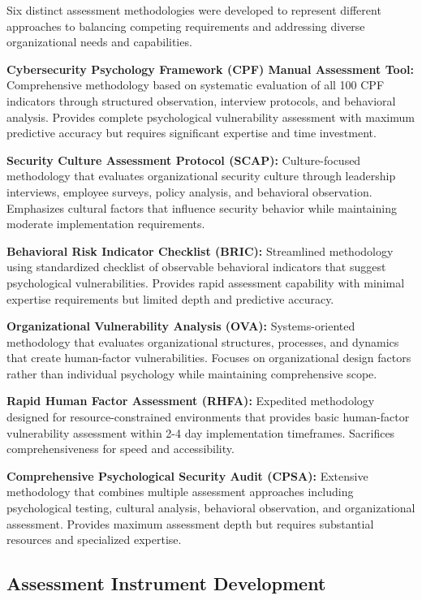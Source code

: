 \documentclass[10pt, twocolumn]{article}
\begin{document}
Six distinct assessment methodologies were developed to represent different approaches to balancing competing requirements and addressing diverse organizational needs and capabilities.

\textbf{Cybersecurity Psychology Framework (CPF) Manual Assessment Tool:} Comprehensive methodology based on systematic evaluation of all 100 CPF indicators through structured observation, interview protocols, and behavioral analysis. Provides complete psychological vulnerability assessment with maximum predictive accuracy but requires significant expertise and time investment.

\textbf{Security Culture Assessment Protocol (SCAP):} Culture-focused methodology that evaluates organizational security culture through leadership interviews, employee surveys, policy analysis, and behavioral observation. Emphasizes cultural factors that influence security behavior while maintaining moderate implementation requirements.

\textbf{Behavioral Risk Indicator Checklist (BRIC):} Streamlined methodology using standardized checklist of observable behavioral indicators that suggest psychological vulnerabilities. Provides rapid assessment capability with minimal expertise requirements but limited depth and predictive accuracy.

\textbf{Organizational Vulnerability Analysis (OVA):} Systems-oriented methodology that evaluates organizational structures, processes, and dynamics that create human-factor vulnerabilities. Focuses on organizational design factors rather than individual psychology while maintaining comprehensive scope.

\textbf{Rapid Human Factor Assessment (RHFA):} Expedited methodology designed for resource-constrained environments that provides basic human-factor vulnerability assessment within 2-4 day implementation timeframes. Sacrifices comprehensiveness for speed and accessibility.

\textbf{Comprehensive Psychological Security Audit (CPSA):} Extensive methodology that combines multiple assessment approaches including psychological testing, cultural analysis, behavioral observation, and organizational assessment. Provides maximum assessment depth but requires substantial resources and specialized expertise.

\subsection{Assessment Instrument Development}
\end{document}
